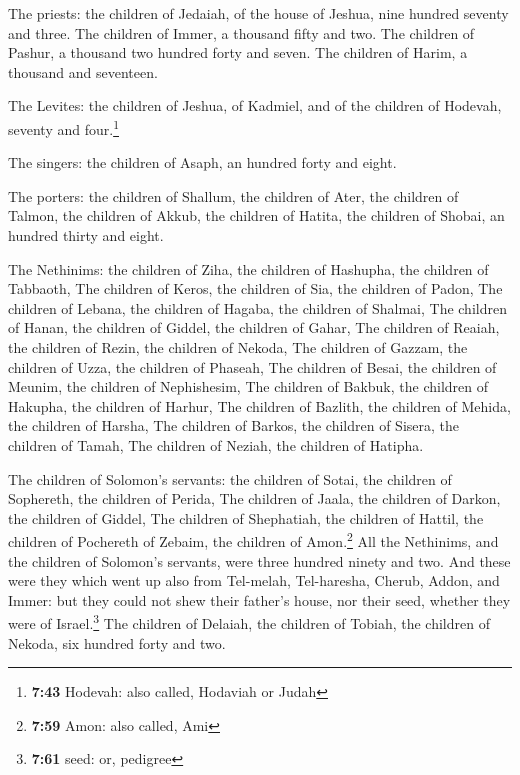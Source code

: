  The priests: the children of Jedaiah, of the house of
Jeshua, nine hundred seventy and three.  The children of
Immer, a thousand fifty and two.  The children of Pashur,
a thousand two hundred forty and seven.  The children of
Harim, a thousand and seventeen.

 The Levites: the children of Jeshua, of Kadmiel, and of
the children of Hodevah, seventy and four.\footnote{\textbf{7:43}
  Hodevah: also called, Hodaviah or Judah}

 The singers: the children of Asaph, an hundred forty and
eight.

 The porters: the children of Shallum, the children of
Ater, the children of Talmon, the children of Akkub, the children of
Hatita, the children of Shobai, an hundred thirty and eight.

 The Nethinims: the children of Ziha, the children of
Hashupha, the children of Tabbaoth,  The children of
Keros, the children of Sia, the children of Padon,  The
children of Lebana, the children of Hagaba, the children of Shalmai,
 The children of Hanan, the children of Giddel, the
children of Gahar,  The children of Reaiah, the children
of Rezin, the children of Nekoda,  The children of
Gazzam, the children of Uzza, the children of Phaseah, 
The children of Besai, the children of Meunim, the children of
Nephishesim,  The children of Bakbuk, the children of
Hakupha, the children of Harhur,  The children of
Bazlith, the children of Mehida, the children of Harsha, 
The children of Barkos, the children of Sisera, the children of Tamah,
 The children of Neziah, the children of Hatipha.

 The children of Solomon's servants: the children of
Sotai, the children of Sophereth, the children of Perida,
 The children of Jaala, the children of Darkon, the
children of Giddel,  The children of Shephatiah, the
children of Hattil, the children of Pochereth of Zebaim, the children of
Amon.\footnote{\textbf{7:59} Amon: also called, Ami}  All
the Nethinims, and the children of Solomon's servants, were three
hundred ninety and two.  And these were they which went
up also from Tel-melah, Tel-haresha, Cherub, Addon, and Immer: but they
could not shew their father's house, nor their seed, whether they were
of Israel.\footnote{\textbf{7:61} seed: or, pedigree} 
The children of Delaiah, the children of Tobiah, the children of Nekoda,
six hundred forty and two.

